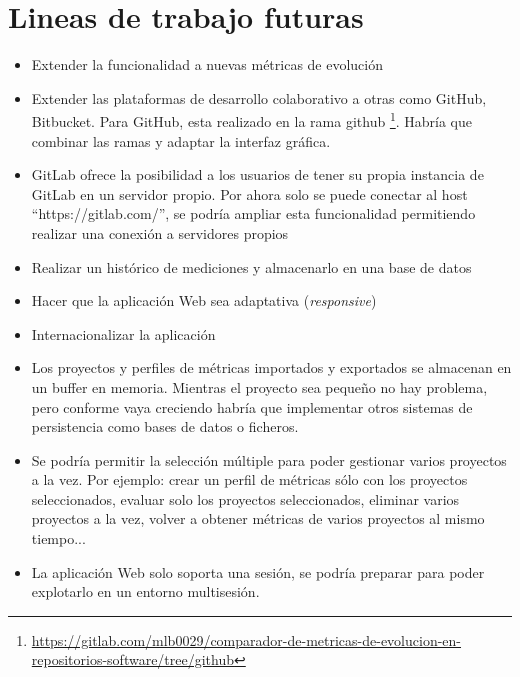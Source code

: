 \section{Lineas de trabajo futuras}

\begin{itemize}
	\item Extender la funcionalidad a nuevas métricas de evolución
	\item Extender las plataformas de desarrollo colaborativo a otras como GitHub, Bitbucket. Para GitHub, esta realizado en la rama github \footnote{\url{https://gitlab.com/mlb0029/comparador-de-metricas-de-evolucion-en-repositorios-software/tree/github}}. Habría que combinar las ramas y adaptar la interfaz gráfica.
	\item GitLab ofrece la posibilidad a los usuarios de tener su propia instancia de GitLab en un servidor propio. Por ahora solo se puede conectar al host ``https://gitlab.com/'', se podría ampliar esta funcionalidad permitiendo realizar una conexión a servidores propios
	\item Realizar un histórico de mediciones y almacenarlo en una base de datos
	\item Hacer que la aplicación Web sea adaptativa (\textit{responsive})
	\item Internacionalizar la aplicación
	\item Los proyectos y perfiles de métricas importados y exportados se almacenan en un buffer en memoria. Mientras el proyecto sea pequeño no hay problema, pero conforme vaya creciendo habría que implementar otros sistemas de persistencia como bases de datos o ficheros.
	\item Se podría permitir la selección múltiple para poder gestionar varios proyectos a la vez. Por ejemplo: crear un perfil de métricas sólo con los proyectos seleccionados, evaluar solo los proyectos seleccionados, eliminar varios proyectos a la vez, volver a obtener métricas de varios proyectos al mismo tiempo...
	\item La aplicación Web solo soporta una sesión, se podría preparar para poder explotarlo en un entorno multisesión.
\end{itemize}
